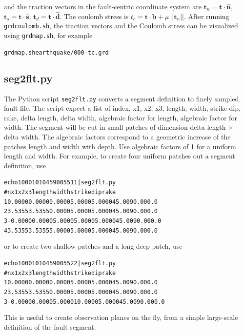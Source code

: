 \documentclass[10pt]{article}
\begin{document}
and the traction vectors in the fault-centric coordinate system are $\textbf{t}_n=\textbf{t}\cdot\hat{\textbf{n}}$, $\textbf{t}_s=\textbf{t}\cdot\hat{\textbf{s}}$, $\textbf{t}_d=\textbf{t}\cdot\hat{\textbf{d}}$. The coulomb stress is $t_c=\textbf{t}\cdot\textbf{b}+\mu\,||\textbf{t}_n||$. After running \verb'grdcoulomb.sh', the traction vectors and the Coulomb stress can be visualized using \verb'grdmap.sh', for example
\begin{alltt}
{\color{orange}grdmap.sh earthquake/000-tc.grd}
\end{alltt}

\subsection{seg2flt.py}

The Python script \verb'seg2flt.py' converts a segment definition to finely sampled fault file. The script expect a list of index, x1, x2, x3, length, width, strike dip, rake, delta length, delta width, algebraic factor for length, algebraic factor for width. The segment will be cut in small patches of dimension delta length $\times$ delta width. The algebraic factors correspond to a geometric increase of the patches length and width with depth. Use algebraic factors of 1 for a uniform length and width. For example, to create four uniform patches out a segment definition, use
\begin{alltt}
{\color{orange}echo 1 0 0 0 10 10 45 90 0 5 5 1 1 | seg2flt.py}
{\color{blue}#  n        x1        x2        x3    length     width   strike   dip  rake
   1    0.0000    0.0000    0.0000    5.0000    5.0000    45.00 90.00  0.0
   2    3.5355    3.5355    0.0000    5.0000    5.0000    45.00 90.00  0.0
   3   -0.0000    0.0000    5.0000    5.0000    5.0000    45.00 90.00  0.0
   4    3.5355    3.5355    5.0000    5.0000    5.0000    45.00 90.00  0.0}
\end{alltt}
or to create two shallow patches and a long deep patch, use
\begin{alltt}
{\color{orange}echo 1 0 0 0 10 10 45 90 0 5 5 2 2 | seg2flt.py}
{\color{blue}#  n        x1        x2        x3    length     width   strike   dip  rake
   1    0.0000    0.0000    0.0000    5.0000    5.0000    45.00 90.00  0.0
   2    3.5355    3.5355    0.0000    5.0000    5.0000    45.00 90.00  0.0
   3   -0.0000    0.0000    5.0000   10.0000    5.0000    45.00 90.00  0.0}
\end{alltt}
This is useful to create observation planes on the fly, from a simple large-scale definition of the fault segment. 
\end{document}
